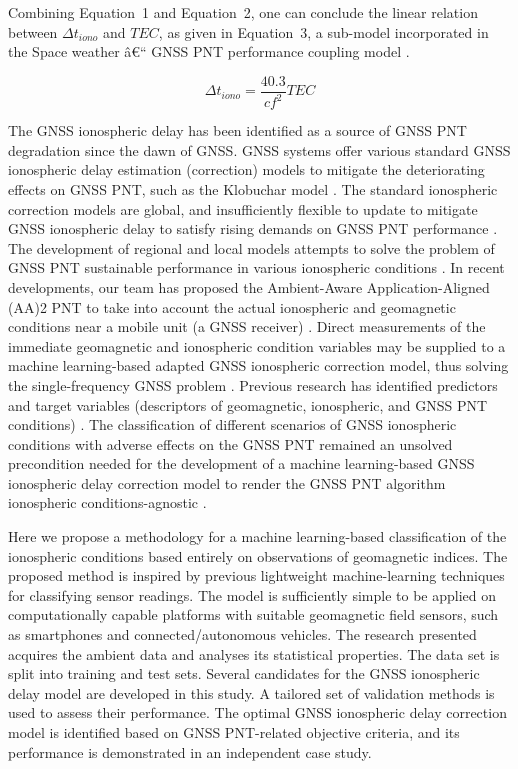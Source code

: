 \documentclass[sn-mathphys-num]{sn-jnl}%
\begin{document}
Combining Equation~1 and Equation~2, one can conclude the linear relation between $\Delta t_{iono}$ and $TEC$, as given in Equation~3, a sub-model incorporated in the Space weather â€“ GNSS PNT performance coupling model \cite{filic2018modelling}.

\begin{equation}
	\Delta t_{iono} = \frac{40.3}{c f^{2}} TEC
	\label{eqn:3}
\end{equation}

The GNSS ionospheric delay has been identified as a source of GNSS PNT degradation since the dawn of GNSS. GNSS systems offer various standard GNSS ionospheric delay estimation (correction) models to mitigate the deteriorating effects on GNSS PNT, such as the Klobuchar model \cite{spilker1996global, filic2018modelling}. The standard ionospheric correction models are global, and insufficiently flexible to update to mitigate GNSS ionospheric delay to satisfy rising demands on GNSS PNT performance \cite{filjar2024ambient, filic2018modelling}. The development of regional and local models attempts to solve the problem of GNSS PNT sustainable performance in various ionospheric conditions \cite{sikirica2021risk}. In recent developments, our team has proposed the Ambient-Aware Application-Aligned (AA)2 PNT to take into account the actual ionospheric and geomagnetic conditions near a mobile unit (a GNSS receiver) \cite{filjar2022application, filic2018modelling, filjar2024ambient}. Direct measurements of the immediate geomagnetic and ionospheric condition variables may be supplied to a machine learning-based adapted GNSS ionospheric correction model, thus solving the single-frequency GNSS problem \cite{filjar2022application}. Previous research has identified predictors and target variables (descriptors of geomagnetic, ionospheric, and GNSS PNT conditions) \cite{filic2018modelling, natras2022ensemble, natras2023regional}. The classification of different scenarios of GNSS ionospheric conditions with adverse effects on the GNSS PNT remained an unsolved precondition needed for the development of a machine learning-based GNSS ionospheric delay correction model to render the GNSS PNT algorithm ionospheric conditions-agnostic \cite{filjar2022application, filjar2024ambient}.

Here we propose a methodology for a machine learning-based classification of the ionospheric conditions based entirely on observations of geomagnetic indices. The proposed method is inspired by previous lightweight machine-learning techniques \cite{filjar2020comparison} for classifying sensor readings. The model is sufficiently simple to be applied on computationally capable platforms with suitable geomagnetic field sensors, such as smartphones and connected/autonomous vehicles. The research presented acquires the ambient data and analyses its statistical properties. The data set is split into training and test sets. Several candidates for the GNSS ionospheric delay model are developed in this study. A tailored set of validation methods is used to assess their performance. The optimal GNSS ionospheric delay correction model is identified based on GNSS PNT-related objective criteria, and its performance is demonstrated in an independent case study.
\end{document}
